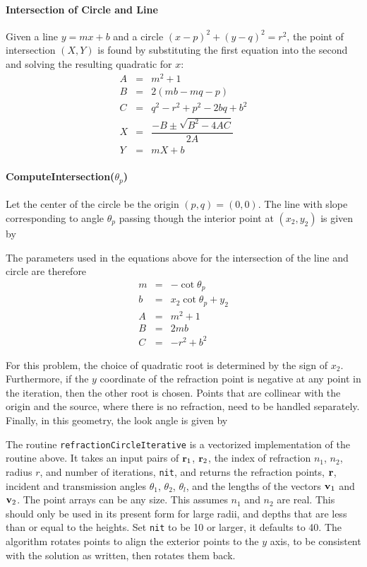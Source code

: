 \clearpage
\paragraph{Intersection of Circle and Line}

Given a line $y = mx + b$ and a circle $(x-p)^2 + (y-q)^2 = r^2$, the point of intersection $(X,Y)$ is found by substituting the first equation into the second and solving the resulting quadratic for $x$:
\begin{eqnarray}
A &=& m^2 + 1 \nonumber \\
B &=& 2(mb - mq - p) \nonumber \\
C &=& q^2 - r^2 + p^2 - 2bq +b^2 \nonumber \\
X &=& \dfrac{-B \pm \sqrt{B^2 - 4AC}}{2A} \nonumber \\
Y &=& mX + b \nonumber
\end{eqnarray}

\paragraph{ComputeIntersection($\theta_p$)}
Let the center of the circle be the origin $(p,q)=(0,0)$. The line with slope corresponding to angle $\theta_p$ passing though the interior point at $(x_2, y_2)$ is given by 

The parameters used in the equations above for the intersection of the line and circle are therefore
\begin{eqnarray}
m &=& -\cot \theta_p \nonumber \\
b &=& x_2\cot\theta_p + y_2 \nonumber \\
A &=& m^2 + 1 \nonumber \\
B &=& 2mb \nonumber \\
C &=& -r^2 + b^2 \nonumber 
\end{eqnarray}

For this problem, the choice of quadratic root is determined by the sign of $x_2$. Furthermore, if the $y$ coordinate of the refraction point is negative at any point in the iteration, then the other root is chosen. Points that are collinear with the origin and the source, where there is no refraction, need to be handled separately. Finally, in this geometry, the look angle is given by 


The routine \texttt{refractionCircleIterative} is a vectorized implementation of the routine above. It takes an input pairs of $\mathbf{r}_1$, $\mathbf{r}_2$, the index of refraction $n_1$, $n_2$, radius $r$, and number of iterations, \texttt{nit}, and returns the refraction points, $\mathbf{r}$, incident and transmission angles $\theta_1$, $\theta_2$, $\theta_l$, and the lengths of the vectors $\mathbf{v}_1$ and $\mathbf{v}_2$. The point arrays can be any size. This assumes $n_1$ and $n_2$ are real. This should only be used in its present form for large radii, and depths that are less than or equal to the heights. Set \texttt{nit} to be 10 or larger, it defaults to 40. The algorithm rotates points to align the exterior points to the $y$ axis, to be consistent with the solution as written, then rotates them back.


